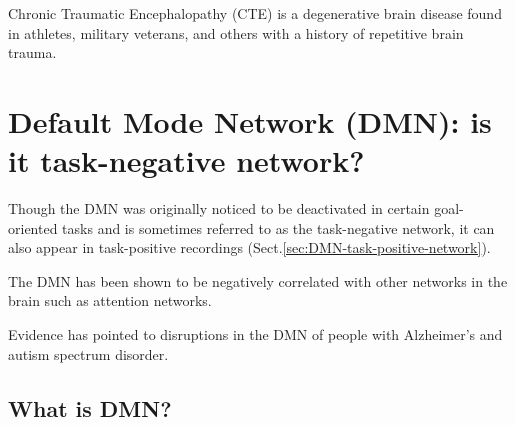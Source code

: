 Chronic Traumatic Encephalopathy (CTE) is a degenerative brain disease found in
athletes, military veterans, and others with a history of repetitive brain
trauma.


\section{Default Mode Network (DMN): is it task-negative network?}
\label{sec:Default-Mode-Network}

Though the DMN was originally noticed to be deactivated in certain goal-oriented
tasks and is sometimes referred to as the task-negative network, it can also
appear in task-positive recordings (Sect.\ref{sec:DMN-task-positive-network}).

The DMN has been shown to be negatively correlated with other networks in the
brain such as attention networks.

Evidence has pointed to disruptions in the DMN of people with Alzheimer's and
autism spectrum disorder.


\subsection{What is DMN?}

